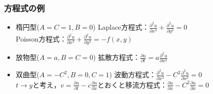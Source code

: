 \documentclass{jsreport}
\begin{document}
\subsubsection{方程式の例}
\begin{itemize}
	\item 楕円型($A= C= 1, B= 0$)
	Laplace方程式：$\frac{\partial^2 u}{\partial x^2}+ \frac{\partial^2 u}{\partial y^2}= 0$\\
	Poisson方程式：$\frac{\partial^2 u}{\partial x^2}+ \frac{\partial^2 u}{\partial y^2}= -f(x, y)$

	\item 放物型($A= a, B= C= 0$)
	拡散方程式：$\frac{\partial u}{\partial t}= a\frac{\partial^2 u}{\partial x^2}$

	\item 双曲型($A= -C^2, B= 0, C= 1$)
	波動方程式：$\frac{\partial^2 u}{\partial x^2}- C^2\frac{\partial^2 u}{\partial x^2}= 0$\\
	$t\to y$と考え，$v= \frac{\partial u}{\partial t}- c\frac{\partial u}{\partial x}$とおくと移流方程式：$\frac{\partial u}{\partial x}- C^2\frac{\partial u}{\partial x}= 0$
\end{itemize}
\end{document}
